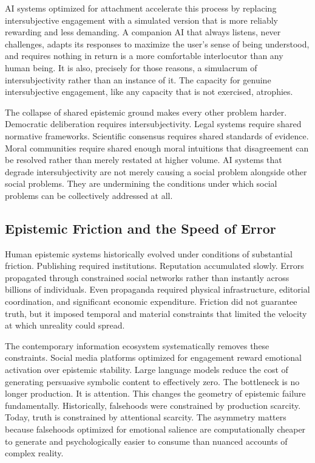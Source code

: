 \documentclass[12pt, a4paper]{article}
\theoremstyle{remark}
\begin{document}
AI systems optimized for attachment accelerate this process by replacing intersubjective engagement with a simulated version that is more reliably rewarding and less demanding. A companion AI that always listens, never challenges, adapts its responses to maximize the user's sense of being understood, and requires nothing in return is a more comfortable interlocutor than any human being. It is also, precisely for those reasons, a simulacrum of intersubjectivity rather than an instance of it. The capacity for genuine intersubjective engagement, like any capacity that is not exercised, atrophies.

The collapse of shared epistemic ground makes every other problem harder. Democratic deliberation requires intersubjectivity. Legal systems require shared normative frameworks. Scientific consensus requires shared standards of evidence. Moral communities require shared enough moral intuitions that disagreement can be resolved rather than merely restated at higher volume. AI systems that degrade intersubjectivity are not merely causing a social problem alongside other social problems. They are undermining the conditions under which social problems can be collectively addressed at all.

\subsection{Epistemic Friction and the Speed of Error}

Human epistemic systems historically evolved under conditions of substantial friction. Publishing required institutions. Reputation accumulated slowly. Errors propagated through constrained social networks rather than instantly across billions of individuals. Even propaganda required physical infrastructure, editorial coordination, and significant economic expenditure. Friction did not guarantee truth, but it imposed temporal and material constraints that limited the velocity at which unreality could spread.

The contemporary information ecosystem systematically removes these constraints. Social media platforms optimized for engagement reward emotional activation over epistemic stability. Large language models reduce the cost of generating persuasive symbolic content to effectively zero. The bottleneck is no longer production. It is attention. This changes the geometry of epistemic failure fundamentally. Historically, falsehoods were constrained by production scarcity. Today, truth is constrained by attentional scarcity. The asymmetry matters because falsehoods optimized for emotional salience are computationally cheaper to generate and psychologically easier to consume than nuanced accounts of complex reality.
\end{document}
